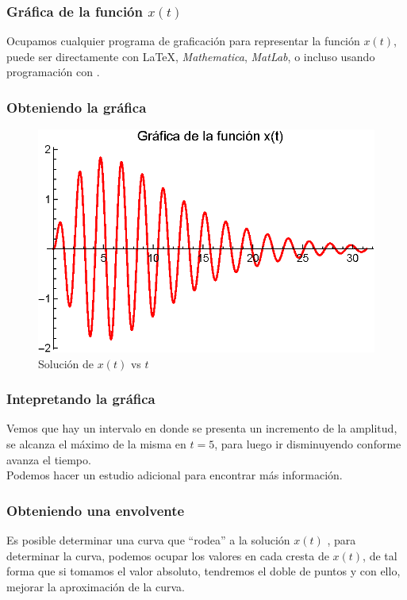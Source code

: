 \begin{frame}
\frametitle{Gráfica de la función $x(t)$}
Ocupamos cualquier programa de graficación para representar la función $x(t)$, puede ser directamente con \LaTeX, \emph{Mathematica}, \emph{MatLab}, o incluso usando programación con  \python.
\end{frame}
\begin{frame}
\frametitle{Obteniendo la gráfica}
\begin{figure}
    \centering
    \includegraphics[scale=1]{Imagenes/Ejemplo_Resonancia_01.eps}
    \caption{Solución de $x(t)$ vs $t$}
\end{figure}
\end{frame}
\begin{frame}
\frametitle{Intepretando la gráfica}
Vemos que hay un intervalo en donde se presenta un incremento de la amplitud, se alcanza el máximo de la misma en $t = 5$, para luego ir disminuyendo conforme avanza el tiempo.
\\
\bigskip
\pause
Podemos hacer un estudio adicional para encontrar más información.
\end{frame}
\begin{frame}
\frametitle{Obteniendo una envolvente}
Es posible determinar una curva que \enquote{rodea} a la solución $x(t)$ \pause, para determinar la curva, podemos ocupar los valores en cada cresta de $x(t)$, de tal forma que si tomamos el valor absoluto, tendremos el doble de puntos y con ello, mejorar la aproximación de la curva.
\end{frame}
